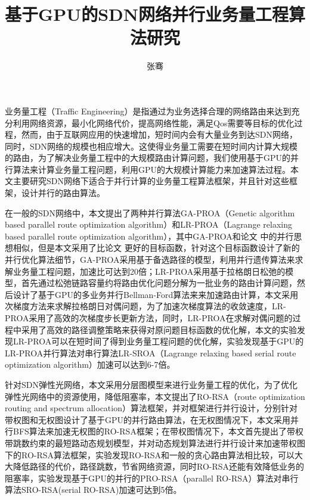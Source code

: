 \documentclass[master]{thesis-uestc}
\title{基于GPU的SDN网络并行业务量工程算法研究}
\author{张骞}
\begin{document}
\begin{chineseabstract}
业务量工程（Traffic Engineering）是指通过为业务选择合理的网络路由来达到充分利用网络资源，最小化网络代价，提高网络性能，满足Qos需要等目标的优化过程，然而，由于互联网应用的快速增加，短时间内会有大量业务到达SDN网络，同时，SDN网络的规模也相应增大。这使得业务量工需要在短时间内计算大规模的路由，为了解决业务量工程中的大规模路由计算问题，我们使用基于GPU的并行算法来计算业务量工程问题，利用GPU的大规模计算能力来加速算法过程。本文主要研究SDN网络下适合于并行计算的业务量工程算法框架，并且针对这些框架，设计并行的路由算法。

在一般的SDN网络中，本文提出了两种并行算法GA-PROA（Genetic algorithm based parallel route optimization algorithm）和LR-PROA（Lagrange relaxing based parallel route optimization algorithm），其中GA-PROA和论文 \cite{ParaTE2}中的并行思想相似，但是本文采用了比论文 \cite{ParaTE2}更好的目标函数，针对这个目标函数设计了新的并行优化算法细节，GA-PROA采用基于备选路径的模型，利用并行遗传算法来求解业务量工程问题，加速比可达到20倍；LR-PROA采用基于拉格朗日松弛的模型，首先通过松弛链路容量约将路由优化问题分解为一批业务的路由计算问题，然后设计了基于GPU的多业务并行Bellman-Ford算法来来加速路由计算，本文采用次梯度方法来求解拉格朗日对偶问题，为了加速次梯度算法的收敛速度，LR-PROA采用了高效的次梯度步长更新方法，同时，LR-PROA在求解对偶问题的过程中采用了高效的路径调整策略来获得对原问题目标函数的优化解，本文的实验发现LR-PROA可以在短时间了得到业务量工程问题的优化解，实验发现基于GPU的LR-PROA并行算法对串行算法LR-SROA（Lagrange relaxing based serial route optimization algorithm）加速可以达到6-7倍。

针对SDN弹性光网络，本文采用分层图模型来进行业务量工程的优化，为了优化弹性光网络中的资源使用，降低阻塞率，本文提出了RO-RSA（route optimization routing and spectrum allocation）算法框架，并对框架进行并行设计，分别针对带权图和无权图设计了基于GPU的并行路由算法，在无权图情况下，本文采用并行BFS算法来加速无权图的RO-RSA框架；在带权图情况下，本文首先提出了带权带跳数约束的最短路动态规划模型，并对动态规划算法进行并行设计来加速带权图下的RO-RSA算法框架，实验发现RO-RSA和一般的贪心路由算法相比较，可以大大降低路径的代价，路径跳数，节省网络资源，同时RO-RSA还能有效降低业务的阻塞率，实验发现基于GPU的并行的PRO-RSA（parallel RO-RSA）算法对串行算法SRO-RSA(serial RO-RSA)加速可达到5倍。

\end{chineseabstract}
\end{document}
